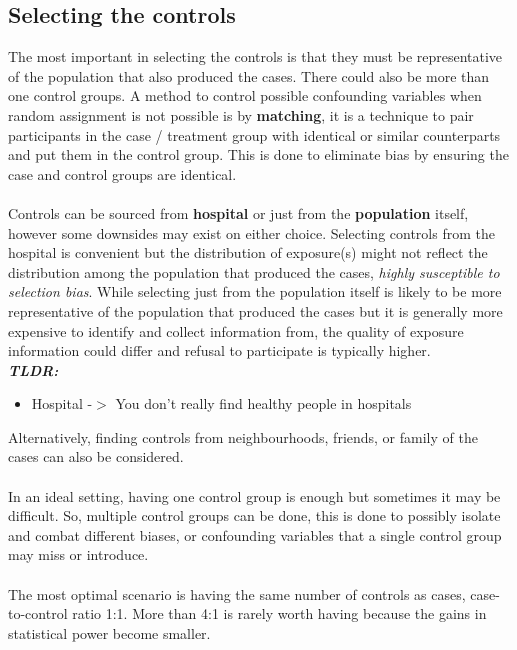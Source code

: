 \documentclass{article}
\begin{document}
\subsection*{Selecting the controls}
The most important in selecting the controls is that they must be representative of the population that also produced the cases. There could also be more than one control groups. A method to control possible confounding variables when random assignment is not possible is by \textbf{matching}, it is a technique to pair participants in the case / treatment group with identical or similar counterparts and put them in the control group. This is done to eliminate bias by ensuring the case and control groups are identical.
\\~\\
Controls can be sourced from \textbf{hospital} or just from the \textbf{population} itself, however some downsides may exist on either choice. Selecting controls from the hospital is convenient but the distribution of exposure(s) might not reflect the distribution among the population that produced the cases, \textit{highly susceptible to selection bias}. While selecting just from the population itself is likely to be more representative of the population that produced the cases but it is generally more expensive to identify and collect information from, the quality of exposure information could differ and refusal to participate is typically higher.
\\
\textbf{\textit{TLDR:}} 
\begin{itemize}
    \item Hospital -$>$ You don't really find healthy people in hospitals
\end{itemize}
Alternatively, finding controls from neighbourhoods, friends, or family of the cases can also be considered.
\\~\\
In an ideal setting, having one control group is enough but sometimes it may be difficult. So, multiple control groups can be done, this is done to possibly isolate and combat different biases, or confounding variables that a single control group may miss or introduce.
\\~\\
The most optimal scenario is having the same number of controls as cases, case-to-control ratio 1:1. More than 4:1 is rarely worth having because the gains in statistical power become smaller.
\end{document}
